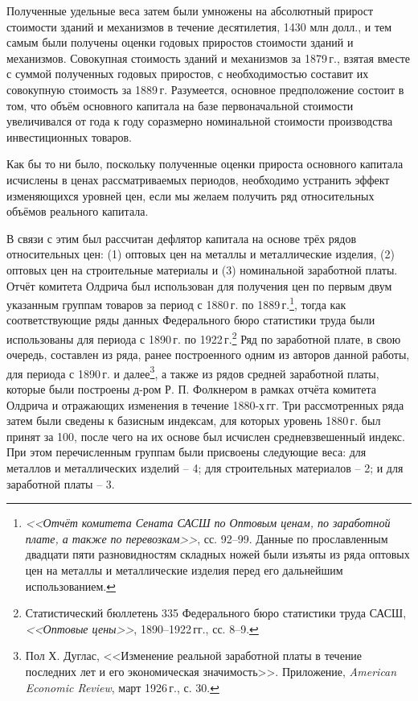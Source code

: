 \documentclass[leqno]{article}  %
\begin{document}
\par
Полученные удельные веса затем были умножены на абсолютный прирост стоимости зданий и механизмов в течение десятилетия, 1430 млн долл., и тем самым были получены оценки годовых приростов стоимости зданий и механизмов. Совокупная стоимость зданий и механизмов за 1879\,г., взятая вместе с суммой полученных годовых приростов, с необходимостью составит их совокупную стоимость за 1889\,г. Разумеется, основное предположение состоит в том, что объём основного капитала на базе первоначальной стоимости увеличивался от года к году соразмерно номинальной стоимости производства инвестиционных товаров.
\par
Как бы то ни было, поскольку полученные оценки прироста основного капитала исчислены в ценах рассматриваемых периодов, необходимо устранить эффект изменяющихся уровней цен, если мы желаем получить ряд относительных объёмов реального капитала.
\par
В связи с этим был рассчитан дефлятор капитала на основе трёх рядов относительных цен: (1) оптовых цен на металлы и металлические изделия, (2) оптовых цен на строительные материалы и (3) номинальной заработной платы. Отчёт комитета Олдрича был использован для получения цен по первым двум указанным группам товаров за период с 1880\,г. по 1889\,г.\footnote{\emph{<<Отчёт комитета Сената САСШ по Оптовым ценам, по заработной плате, а также по перевозкам>>}, сс. 92--99. Данные по прославленным двадцати пяти разновидностям складных ножей были изъяты из ряда оптовых цен на металлы и металлические изделия перед его дальнейшим использованием.}, тогда как соответствующие ряды данных Федерального бюро статистики труда были использованы для периода с 1890\,г. по 1922\,г.\footnote{Статистический бюллетень 335 Федерального бюро статистики труда САСШ, \emph{<<Оптовые цены>>}, 1890--1922\,гг., сс. 8--9.} Ряд по заработной плате, в свою очередь, составлен из ряда, ранее построенного одним из авторов данной работы, для периода с 1890\,г. и далее\footnote{Пол Х. Дуглас, <<Изменение реальной заработной платы в течение последних лет и его экономическая значимость>>. Приложение, \emph{American Economic Review}, март 1926\,г., с. 30.}, а также из рядов средней заработной платы, которые были построены д-ром Р. П. Фолкнером в рамках отчёта комитета Олдрича и отражающих изменения в течение 1880-х\,гг. Три рассмотренных ряда затем были сведены к базисным индексам, для которых уровень 1880\,г. был принят за 100, после чего на их основе
был исчислен средневзвешенный индекс. При этом перечисленным группам были присвоены следующие веса: для металлов и металлических изделий -- 4; для строительных материалов -- 2; и для заработной платы -- 3.
\par
\end{document}
